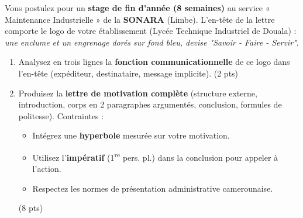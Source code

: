 \documentclass[11pt]{article}
\begin{document}
\begin{exercice}
Vous postulez pour un \textbf{stage de fin d'année (8 semaines)} au service « Maintenance Industrielle » de la \textbf{SONARA} (Limbe). L'en-tête de la lettre comporte le logo de votre établissement (Lycée Technique Industriel de Douala) : \textit{une enclume et un engrenage dorés sur fond bleu, devise "Savoir - Faire - Servir"}.
\begin{enumerate}
    \item Analysez en trois lignes la \textbf{fonction communicationnelle} de ce logo dans l'en-tête (expéditeur, destinataire, message implicite). (2 pts)
    \item Produisez la \textbf{lettre de motivation complète} (structure externe, introduction, corps en 2 paragraphes argumentés, conclusion, formules de politesse). Contraintes : 
    \begin{itemize}
        \item Intégrez une \textbf{hyperbole} mesurée sur votre motivation.
        \item Utilisez l'\textbf{impératif} (1\textsuperscript{re} pers. pl.) dans la conclusion pour appeler à l'action.
        \item Respectez les normes de présentation administrative camerounaise.
    \end{itemize}
    (8 pts)
\end{enumerate}
\end{exercice}
\end{document}

